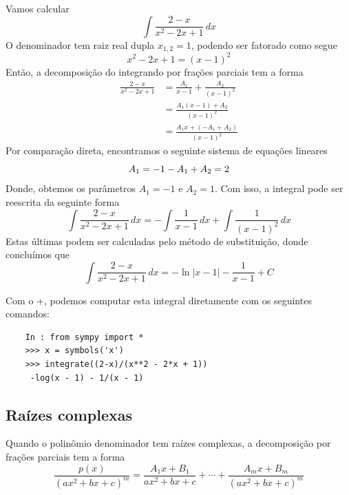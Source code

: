 \begin{ex}
  Vamos calcular
  \begin{equation}
    \int \frac{2-x}{x^2 - 2x + 1}\,dx
  \end{equation}
  O denominador tem raiz real dupla $x_{1,2} = 1$, podendo ser fatorado como segue
  \begin{equation}
    x^2 - 2x + 1 = (x-1)^2
  \end{equation}
  Então, a decomposição do integrando por frações parciais tem a forma
  \begin{align}
    \frac{2-x}{x^2 - 2x + 1} &= \frac{A_1}{x-1} + \frac{A_2}{(x-1)^2}\\
                             &= \frac{A_1(x-1) + A_2}{(x-1)^2}\\
                             &= \frac{A_1x + (-A_1 + A_2)}{(x-1)^2}
  \end{align}
  Por comparação direta, encontramos o seguinte sistema de equações lineares
  \begin{equation}
    A_1 = -1\\
    -A_1 + A_2 = 2
  \end{equation}
  Donde, obtemos os parâmetros $A_1 = -1$ e $A_2 = 1$. Com isso, a integral pode ser reescrita da seguinte forma
  \begin{equation}
    \int\frac{2-x}{x^2 - 2x + 1}\,dx = -\int\frac{1}{x-1}\,dx + \int\frac{1}{(x-1)^2}\,dx
  \end{equation}
  Estas últimas podem ser calculadas pelo método de substituição, donde concluímos que
  \begin{equation}
    \int\frac{2-x}{x^2 - 2x + 1}\,dx = -\ln|x-1| - \frac{1}{x-1} + C
  \end{equation}

  \ifispython
  Com o {\python}+{\sympy}, podemos computar esta integral diretamente com os seguintes comandos:
  \begin{lstlisting}
    In : from sympy import *
    >>> x = symbols('x')
    >>> integrate((2-x)/(x**2 - 2*x + 1))
     -log(x - 1) - 1/(x - 1)
  \end{lstlisting}
  \fi  
\end{ex}

\subsection{Raízes complexas}

Quando o polinômio denominador tem raízes complexas, a decomposição por frações parciais tem a forma
\begin{equation}
  \frac{p(x)}{(ax^2 + bx + c)^m} = \frac{A_1x + B_1}{ax^2 + bx + c} + \cdots + \frac{A_mx + B_m}{(ax^2 + bx + c)^m}
\end{equation}

